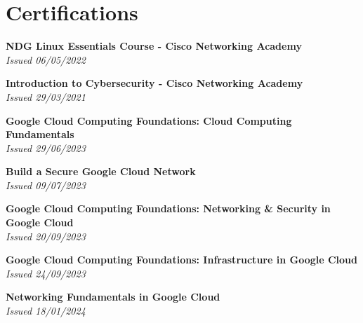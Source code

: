\documentclass[letterpaper,11pt]{article}
\begin{document}
 \section{Certifications}
  \begin{itemize}[leftmargin=0.15in, label={}]
    \small{\item{
     \textbf{NDG Linux Essentials Course - Cisco Networking Academy} \\
     \textit{Issued 06/05/2022} \\
    }}
    \small{\item{
     \textbf{Introduction to Cybersecurity - Cisco Networking Academy} \\
     \textit{Issued 29/03/2021} \\
    }}
    \small{\item{
     \textbf{Google Cloud Computing Foundations: Cloud Computing Fundamentals} \\
     \textit{Issued 29/06/2023} \\
    }}
    \small{\item{
     \textbf{Build a Secure Google Cloud Network} \\
     \textit{Issued 09/07/2023} \\
    }}
    \small{\item{
     \textbf{Google Cloud Computing Foundations: Networking \& Security in Google Cloud} \\
     \textit{Issued 20/09/2023} \\
    }}
    \small{\item{
     \textbf{Google Cloud Computing Foundations: Infrastructure in Google Cloud} \\
     \textit{Issued 24/09/2023} \\
    }}
    \small{\item{
     \textbf{Networking Fundamentals in Google Cloud} \\
     \textit{Issued 18/01/2024} \\
    }}
  \end{itemize}



\end{document}
